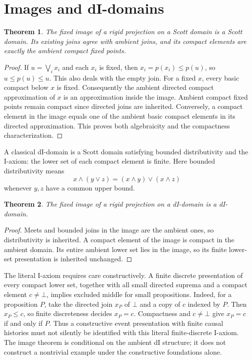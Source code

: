 \documentclass[11pt]{article}
\newtheorem{theorem}{Theorem}[section]
\begin{document}
\section{Images and dI-domains}

\begin{theorem}
The fixed image of a rigid projection on a Scott domain is a Scott
domain. Its existing joins agree with ambient joins, and its compact
elements are exactly the ambient compact fixed points.
\end{theorem}
\begin{proof}
If $u=\bigvee_i x_i$ and each $x_i$ is fixed, then
$x_i=p(x_i)\le p(u)$, so $u\le p(u)\le u$. This also deals with
the empty join. For a fixed $x$, every basic compact below $x$ is fixed.
Consequently the ambient directed compact approximation of $x$ is an
approximation inside the image. Ambient compact fixed points remain
compact since directed joins are inherited. Conversely, a compact
element in the image equals one of the ambient basic compact elements
in its directed approximation. This proves both algebraicity and the
compactness characterization.
\end{proof}

A classical dI-domain is a Scott domain satisfying bounded
distributivity and the I-axiom: the lower set of each compact element is
finite. Here bounded distributivity means
\[
 x\wedge(y\vee z)=(x\wedge y)\vee(x\wedge z)
\]
whenever $y,z$ have a common upper bound.

\begin{theorem}
The fixed image of a rigid projection on a dI-domain is a dI-domain.
\end{theorem}
\begin{proof}
Meets and bounded joins in the image are the ambient ones, so
distributivity is inherited. A compact element of the image is compact
in the ambient domain. Its entire ambient lower set lies in the image,
so its finite lower-set presentation is inherited unchanged.
\end{proof}

The literal I-axiom requires care constructively. A finite discrete
presentation of every compact lower set, together with all small
directed suprema and a compact element $c\ne\bot$, implies excluded
middle for small propositions. Indeed, for a proposition $P$, take the
directed join $x_P$ of $\bot$ and a copy of $c$ indexed by $P$.
Then $x_P\le c$, so finite discreteness decides $x_P=c$. Compactness
and $c\ne\bot$ give $x_P=c$ if and only if $P$. Thus a constructive
event presentation with finite causal histories must not silently be
identified with this literal finite-discrete I-axiom. The image theorem
is conditional on the ambient dI structure; it does not construct a
nontrivial example under the constructive foundations alone.
\end{document}
